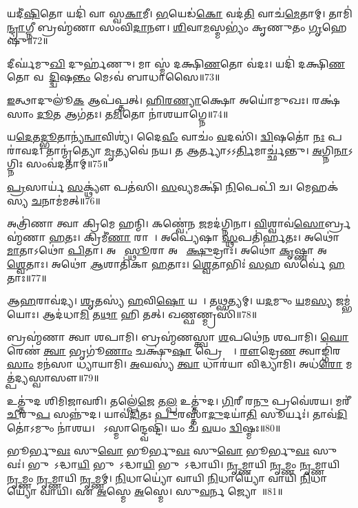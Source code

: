 𑌯𑌦𑍀॑\ul{𑌷𑌿}𑌤𑍋 𑌯𑌦𑌿॑ 𑌵𑌾 𑌸𑍍𑌵\ul{𑌕𑌾}𑌮𑍀। 
\ul{𑌭}𑌯𑍇𑌡॑\ul{𑌕𑍋} 𑌵𑌦॑\ul{𑌤𑌿} 𑌵𑌾𑌚॑\ul{𑌮𑍇}𑌤𑌾𑌮𑍍। 
𑌤𑌾𑌮𑌿॑\ul{𑌨𑍍𑌦𑍍𑌰𑌾}𑌗𑍍𑌨𑍀 𑌬𑍍𑌰𑌹𑍍𑌮॑𑌣𑌾 𑌸𑌂𑌵𑌿\ul{𑌦𑌾}𑌨𑍗। 
\ul{𑌶𑌿}𑌵𑌾\ul{𑌮}𑌸𑍍𑌮𑌭𑍍𑌯𑌂॑ 𑌕𑍃𑌣𑍁𑌤𑌂 \ul{𑌗𑍃}𑌹𑍇𑌷𑍁॑॥72॥
\anuvakamend

𑌦𑍀𑌰𑍍𑌘॑𑌮𑍁\ul{𑌖𑌿} 𑌦𑍁𑌰𑍍\mbox{}𑌹॑𑌣𑍁। 
𑌮𑌾 𑌸𑍍𑌮॑ 𑌦𑌕𑍍𑌷𑌿\ul{𑌣}𑌤𑍋 𑌵॑𑌦𑌃। 
𑌯𑌦𑌿॑ 𑌦𑌕𑍍𑌷𑌿\ul{𑌣}𑌤𑍋 𑌵𑌦𑌾᳚\ul{𑌦𑍍𑌦𑍍𑌵𑌿}𑌷\ul{𑌨𑍍𑌤𑌂} 𑌮𑍇𑌽𑌵॑ 𑌬𑌾𑌧𑌾𑌸𑍈॥73॥
\anuvakamend

\ul{𑌇}𑌤𑍍𑌥𑌾𑌦𑍁𑌲𑍂॑\ul{𑌕} 𑌆𑌪॑𑌪𑍍𑌤𑌤𑍍। 
\ul{𑌹𑌿}\ul{𑌰}\ul{𑌣𑍍𑌯𑌾}𑌕𑍍𑌷𑍋 𑌅𑌯𑍋॑𑌮𑍁𑌖𑌃। 
𑌰𑌕𑍍𑌷॑𑌸𑌾𑌂 \ul{𑌦𑍂}𑌤 𑌆𑌗॑𑌤𑌃। 
𑌤\ul{𑌮𑌿}𑌤𑍋 𑌨𑌾॑𑌶𑌯𑌾𑌗𑍍𑌨𑍇॥74॥
\anuvakamend


𑌯\ul{𑌦𑍇}𑌤\ul{𑌦𑍍𑌭𑍂}𑌤𑌾𑌨𑍍𑌯॑\ul{𑌨𑍍𑌵𑌾}𑌵𑌿𑌶𑍍𑌯॑। 
𑌦𑍈\ul{𑌵𑍀𑌂} 𑌵𑌾𑌚𑌂॑ \ul{𑌵}𑌦𑌸𑌿॑। 
\ul{𑌦𑍍𑌵𑌿}𑌷𑌤𑍋॑ \ul{𑌨𑌃} 𑌪𑌰𑌾॑𑌵𑌦। 
𑌤𑌾𑌨𑍍𑌮𑍃॑𑌤𑍍𑌯𑍋 \ul{𑌮𑍃}𑌤𑍍𑌯𑌵𑍇॑ 𑌨𑌯। 
𑌤 𑌆𑌰𑍍𑌤𑍍𑌯𑌾𑌽𑌽\ul{𑌰𑍍𑌤𑌿}𑌮𑌾𑌰𑍍𑌚𑍍𑌛॑𑌨𑍍𑌤𑍁। 
\ul{𑌅}𑌗𑍍𑌨𑌿\ul{𑌨𑌾}𑌽𑌗𑍍𑌨𑌿𑌃 𑌸𑌂𑌵॑𑌦𑌤𑌾𑌮𑍍॥75॥
\anuvakamend


\ul{𑌪𑍍𑌰}𑌸𑌾𑌰𑍍𑌯॑ \ul{𑌸}𑌕𑍍𑌥𑍍𑌯𑍗॑ 𑌪𑌤॑𑌸𑌿। 
\ul{𑌸}𑌵𑍍𑌯𑌮𑌕𑍍𑌷𑌿॑ \ul{𑌨𑌿}𑌪𑍇𑌪𑌿॑ 𑌚। 
𑌮𑍇𑌹𑌕॑𑌸𑍍𑌯 \ul{𑌚}𑌨𑌾𑌮॑𑌮𑌤𑍍॥76॥
\anuvakamend


𑌅𑌤𑍍𑌰𑌿॑𑌣𑌾 𑌤𑍍𑌵𑌾 𑌕𑍍𑌰𑌿𑌮𑍇 𑌹𑌨𑍍𑌮𑌿। 
𑌕𑌣𑍍𑌵𑍇॑𑌨 \ul{𑌜}𑌮𑌦॑𑌗𑍍𑌨𑌿𑌨𑌾। 
\ul{𑌵𑌿}𑌶𑍍𑌵𑌾𑌵॑\ul{𑌸𑍋}𑌰𑍍𑌬𑍍𑌰𑌹𑍍𑌮॑𑌣𑌾 \ul{𑌹}𑌤𑌃। 
𑌕𑍍𑌰𑌿𑌮𑍀॑\ul{𑌣𑌾}\ul{} 𑌰𑌾𑌜𑌾᳚। 
𑌅𑌪𑍍𑌯𑍇॑𑌷𑌾 \ul{𑌸𑍍𑌥}𑌪𑌤𑌿॑𑌰𑍍\mbox{}\ul{𑌹}𑌤𑌃। 
𑌅𑌥𑍋॑ \ul{𑌮𑌾}𑌤𑌾𑌽𑌥𑍋॑ \ul{𑌪𑌿}𑌤𑌾। 
𑌅𑌥𑍋᳚ \ul{𑌸𑍍𑌥𑍂}𑌰𑌾 𑌅𑌥𑍋᳚ \ul{𑌕𑍍𑌷𑍁}𑌦𑍍𑌰𑌾𑌃। 
𑌅𑌥𑍋॑ \ul{𑌕𑍃}𑌷𑍍𑌣𑌾 𑌅𑌥𑍋᳚ \ul{𑌶𑍍𑌵𑍇}𑌤𑌾𑌃। 
𑌅𑌥𑍋॑ \ul{𑌆}𑌶𑌾𑌤𑌿॑𑌕𑌾 \ul{𑌹}𑌤𑌾𑌃। 
\ul{𑌶𑍍𑌵𑍇}𑌤𑌾𑌭𑌿𑌃॑ \ul{𑌸}𑌹 𑌸𑌰𑍍𑌵𑍇॑ \ul{𑌹}𑌤𑌾𑌃॥77॥
\anuvakamend


𑌆\ul{𑌹}𑌰𑌾𑌵॑𑌦𑍍𑌯। 
\ul{𑌶𑍃}𑌤𑌸𑍍𑌯॑ \ul{𑌹}𑌵𑌿\ul{𑌷𑍋} 𑌯𑌥𑌾᳚। 
𑌤\ul{𑌥𑍍𑌸}𑌤𑍍𑌯𑌮𑍍। 
𑌯\ul{𑌦}𑌮𑍁𑌂 \ul{𑌯}𑌮\ul{𑌸𑍍𑌯} 𑌜𑌮𑍍𑌭॑𑌯𑍋𑌃। 
𑌆𑌦॑𑌧𑌾\ul{𑌮𑌿} 𑌤\ul{𑌥𑌾} 𑌹𑌿 𑌤𑌤𑍍। 
𑌖𑌣𑍍𑌫𑌣𑍍𑌮𑍍𑌰𑌸𑌿॑॥78॥
\anuvakamend


𑌬𑍍𑌰𑌹𑍍𑌮॑𑌣𑌾 𑌤𑍍𑌵𑌾 𑌶𑌪𑌾𑌮𑌿। 
𑌬𑍍𑌰𑌹𑍍𑌮॑𑌣𑌸𑍍𑌤𑍍𑌵𑌾 \ul{𑌶}𑌪𑌥𑍇॑𑌨 𑌶𑌪𑌾𑌮𑌿। 
\ul{𑌘𑍋}𑌰𑍇𑌣॑ \ul{𑌤𑍍𑌵𑌾} 𑌭𑍃𑌗𑍂॑\ul{𑌣𑌾𑌂} 𑌚𑌕𑍍𑌷𑍁॑\ul{𑌷𑌾} 𑌪𑍍𑌰𑍇𑌕𑍍𑌷𑍇᳚। 
\ul{𑌰𑍗}𑌦𑍍𑌰𑍇\ul{𑌣} 𑌤𑍍𑌵𑌾𑌙𑍍𑌗𑌿॑𑌰\ul{𑌸𑌾𑌂} 𑌮𑌨॑𑌸𑌾 𑌧𑍍𑌯𑌾𑌯𑌾𑌮𑌿। 
\ul{𑌅}𑌘𑌸𑍍𑌯॑ \ul{𑌤𑍍𑌵𑌾} 𑌧𑌾𑌰॑𑌯𑌾 𑌵𑌿𑌦𑍍𑌧𑍍𑌯𑌾𑌮𑌿। 
𑌅𑌧॑\ul{𑌰𑍋} 𑌮𑌤𑍍𑌪॑𑌦𑍍𑌯𑌸𑍍𑌵𑌾𑌸𑍗॥79॥%
\anuvakamend


𑌉𑌤𑍍𑌤𑍁॑𑌦 𑌶𑌿𑌮𑌿𑌜𑌾𑌵𑌰𑌿। 
𑌤𑌲𑍍𑌪𑍇॑\ul{𑌜𑍇} 𑌤\ul{𑌲𑍍𑌪} 𑌉𑌤𑍍𑌤𑍁॑𑌦। 
\ul{𑌗𑌿}𑌰𑍀 𑌰\ul{𑌨𑍁} 𑌪𑍍𑌰𑌵𑍇॑𑌶𑌯। 
𑌮𑌰𑍀॑\ul{𑌚𑍀}𑌰𑍁\ul{𑌪} 𑌸𑌨𑍍𑌨𑍁॑𑌦। 
𑌯𑌾𑌵॑\ul{𑌦𑌿}𑌤𑌃 \ul{𑌪𑍁}𑌰𑌸𑍍𑌤𑌾॑\ul{𑌦𑍁}𑌦𑌯𑌾॑\ul{𑌤𑌿} 𑌸𑍂𑌰𑍍𑌯𑌃॑। 
𑌤𑌾𑌵॑\ul{𑌦𑌿}𑌤𑍋॑𑌽𑌮𑍁𑌂 𑌨𑌾॑𑌶𑌯। 
𑌯𑍋᳚𑌽𑌸𑍍𑌮𑌾𑌨𑍍𑌦𑍍𑌵𑍇𑌷𑍍𑌟𑌿॑। 
𑌯𑌂 𑌚॑ \ul{𑌵}𑌯𑌂 \ul{𑌦𑍍𑌵𑌿}𑌷𑍍𑌮𑌃॥80॥
\anuvakamend


𑌭𑍂𑌰𑍍𑌭𑍁\ul{𑌵𑌃} 𑌸𑍁\ul{𑌵𑍋} 𑌭𑍂𑌰𑍍𑌭𑍁\ul{𑌵𑌃} 𑌸𑍁\ul{𑌵𑍋} 𑌭𑍂𑌰𑍍𑌭𑍁\ul{𑌵𑌃} 𑌸𑍁𑌵𑌃॑। 
𑌭𑍁𑌵𑍋᳚𑌽𑌦𑍍𑌧𑌾\ul{𑌯𑌿} 𑌭𑍁𑌵𑍋᳚𑌽𑌦𑍍𑌧𑌾\ul{𑌯𑌿} 𑌭𑍁𑌵𑍋᳚𑌽𑌦𑍍𑌧𑌾𑌯𑌿। 
\ul{𑌨𑍃}𑌮𑍍𑌣𑌾𑌯𑌿 \ul{𑌨𑍃}𑌮𑍍𑌣𑌂 \ul{𑌨𑍃}𑌮𑍍𑌣𑌾𑌯𑌿 \ul{𑌨𑍃}𑌮𑍍𑌣𑌂 \ul{𑌨𑍃}𑌮𑍍𑌣𑌾𑌯𑌿 \ul{𑌨𑍃}𑌮𑍍𑌣𑌮𑍍। 
\ul{𑌨𑌿}𑌧𑌾𑌯𑍍𑌯𑍋॑ 𑌵𑌾𑌯𑌿 \ul{𑌨𑌿}𑌧𑌾𑌯𑍍𑌯𑍋॑ 𑌵𑌾𑌯𑌿 \ul{𑌨𑌿}𑌧𑌾𑌯𑍍𑌯𑍋॑ 𑌵𑌾𑌯𑌿। 
𑌏 \ul{𑌅}𑌸𑍍𑌮𑍇 \ul{𑌅}𑌸𑍍𑌮𑍇। 
𑌸𑍁\ul{𑌵}𑌰𑍍𑌨 𑌜𑍍𑌯𑍋𑌤𑍀𑌃᳚॥81॥
\anuvakamend


